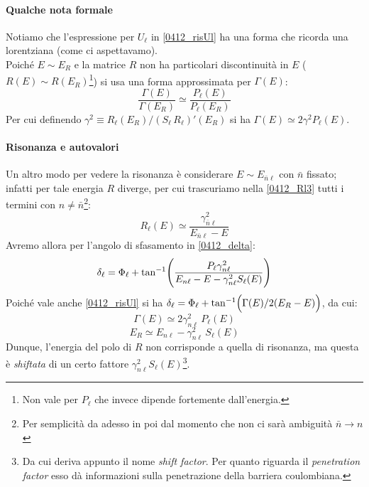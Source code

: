 \paragraph{Qualche nota formale} Notiamo che l'espressione per $U_\ell$ in \eqref{0412_risUl} ha una forma che ricorda una lorentziana (come ci aspettavamo). \\
Poiché $E\sim E_R$ e la matrice $R$ non ha particolari discontinuità in $E$ ($R(E)\sim R(E_R)$\footnote{Non vale per $P_\ell$ che invece dipende fortemente dall'energia.}) si usa una forma approssimata per $\Gamma (E)$:
$$\frac{\Gamma (E)}{\Gamma (E_R)} \simeq \frac{P_\ell (E)}{P_\ell (E_R)}$$
Per cui definendo $\gamma^2 \equiv R_\ell (E_R)/ (S_\ell\, R_\ell)' (E_R)$ si ha $\Gamma (E) \simeq 2\gamma^2 P_\ell (E)$.

\paragraph{Risonanza e autovalori} Un altro modo per vedere la risonanza è considerare $E\sim E_{\bar{n}\ell}$ con $\bar{n}$ fissato; infatti per tale energia $R$ diverge, per cui trascuriamo nella \eqref{0412_Rl3} tutti i termini con $n\not = \bar{n}$\footnote{Per semplicità da adesso in poi dal momento che non ci sarà ambiguità $\bar{n}\to n$}:
$$R_\ell (E) \simeq \frac{\gamma_{\bar{n}\ell}^2}{E_{\bar{n}\ell} - E}$$
Avremo allora per l'angolo di sfasamento in \eqref{0412_delta}:
$$\delta_\ell = \Phi_\ell + \tan^{-1} \Biggl ( \frac{P_\ell \gamma^2_{n\ell}}{E_{n\ell}-E - \gamma_{n\ell}^2 S_\ell(E)} \Biggr )$$
Poiché vale anche \eqref{0412_risUl} si ha $\delta_\ell = \Phi_\ell + \tan^{-1} \Bigl ( \Gamma(E)/2(E_R-E) \Bigr )$, da cui:
$$\Gamma (E) \simeq 2  \gamma^2_{n\ell}\,P_\ell (E)$$
\begin{equation}\label{0414_ERshift}
E_R \simeq E_{n\ell} - \gamma^2_{n\ell}\, S_\ell(E)
\end{equation}
Dunque, l'energia del polo di $R$ non corrisponde a quella di risonanza, ma questa è \textit{shiftata} di un certo fattore $\gamma^2_{n\ell} S_\ell(E)$\footnote{Da cui deriva appunto il nome \textit{shift factor}. Per quanto riguarda il \textit{penetration factor} esso dà informazioni sulla penetrazione della barriera coulombiana.}.

